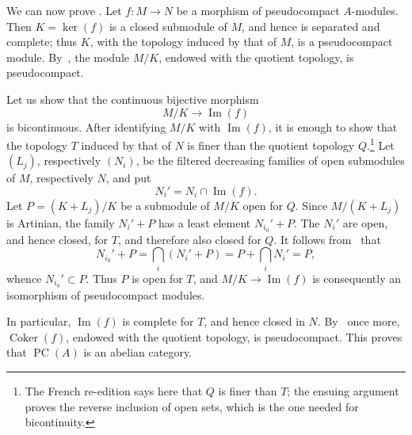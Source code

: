 \label{sga3:VIIB:0.2.B-proof}
We can now prove . Let \(f:M\to N\) be a morphism of
pseudocompact \(A\)-modules. Then \(K=\ker(f)\) is a closed submodule
of \(M\), and hence is separated and complete; thus \(K\), with the
topology induced by that of \(M\), is a pseudocompact module. By
\,\textup{}, the module \(M/K\), endowed with the quotient
topology, is pseudocompact.

Let us show that the continuous bijective morphism
\[
  M/K\longrightarrow\operatorname{Im}(f)
\]
is bicontinuous. After identifying \(M/K\) with
\(\operatorname{Im}(f)\), it is enough to show that the topology
\(T\) induced by that of \(N\) is finer than the quotient topology
\(Q\).\footnote{The French re-edition says here that \(Q\) is finer
than \(T\); the ensuing argument proves the reverse inclusion of open
sets, which is the one needed for bicontinuity.} Let \((L_j)\),
respectively \((N_i)\), be the filtered
decreasing families of open submodules of \(M\), respectively \(N\),
and put
\[
  N_i'=N_i\cap\operatorname{Im}(f).
\]
Let \(P=(K+L_j)/K\) be a submodule of \(M/K\) open for \(Q\). Since
\(M/(K+L_j)\) is Artinian, the family \(N_i'+P\) has a least element
\(N_{i_0}'+P\). The \(N_i'\) are open, and hence closed, for \(T\),
and therefore also closed for \(Q\). It follows from
\,\textup{} that
\[
  N_{i_0}'+P
  =\bigcap_i(N_i'+P)
  =P+\bigcap_i N_i'
  =P,
\]
whence \(N_{i_0}'\subset P\). Thus \(P\) is open for \(T\), and
\(M/K\to\operatorname{Im}(f)\) is consequently an isomorphism of
pseudocompact modules.

In particular, \(\operatorname{Im}(f)\) is complete for \(T\), and
hence closed in \(N\). By \,\textup{} once more,
\(\operatorname{Coker}(f)\), endowed with the quotient topology, is
pseudocompact. This proves that \(\operatorname{PC}(A)\) is an
abelian category.

